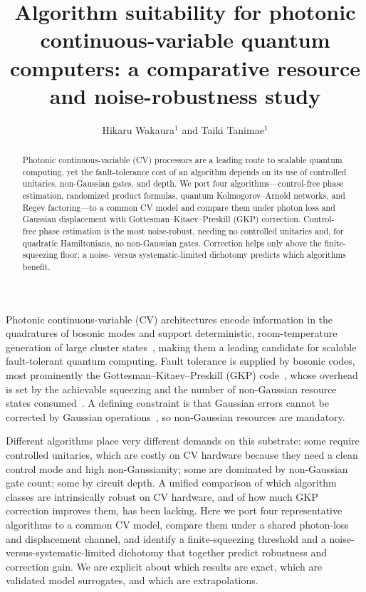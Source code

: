\documentclass[10pt]{iopart}
\begin{document}
\title[Algorithm suitability for photonic continuous-variable hardware]{Algorithm suitability for photonic continuous-variable
quantum computers: a comparative resource and noise-robustness study}

\author{Hikaru Wakaura$^{1}$ and Taiki Tanimae$^{1}$}
\address{$^{1}$ QIRI (Quantum Integrated Research Institute Inc.),
1--16--3 Akasaka, Minato-ku, Tokyo 107--0061, Japan}

\begin{abstract} 
Photonic continuous-variable (CV) processors are a leading route to scalable
quantum computing, yet the fault-tolerance cost of an algorithm depends on its
use of controlled unitaries, non-Gaussian gates, and depth. We port four
algorithms---control-free phase estimation, randomized product formulas,
quantum Kolmogorov--Arnold networks, and Regev factoring---to a common CV model
and compare them under photon loss and Gaussian displacement with
Gottesman--Kitaev--Preskill (GKP) correction. Control-free phase estimation is
the most noise-robust, needing no controlled unitaries and, for quadratic
Hamiltonians, no non-Gaussian gates. Correction helps only above the
finite-squeezing floor; a noise- versus systematic-limited dichotomy predicts
which algorithms benefit.  
\end{abstract}
   
\maketitle
\ioptwocol 
  
Photonic continuous-variable (CV) architectures encode information in the
quadratures of bosonic modes and support deterministic, room-temperature
generation of large cluster states~\cite{Lloyd1999,Menicucci2014,Larsen2019,
Asavanant2019,Madsen2022}, making them a leading candidate for scalable
fault-tolerant quantum computing. Fault tolerance is supplied by bosonic codes,
most prominently the Gottesman--Kitaev--Preskill (GKP) code~\cite{GKP2001},
whose overhead is set by the achievable squeezing and the number of
non-Gaussian resource states consumed~\cite{Fukui2018,Bourassa2021,Tzitrin2021,
Noh2020}. A defining constraint is that Gaussian errors cannot be corrected by
Gaussian operations~\cite{Niset2009}, so non-Gaussian resources are mandatory.

Different algorithms place very different demands on this substrate: some
require controlled unitaries, which are costly on CV hardware because they need
a clean control mode and high non-Gaussianity; some are dominated by
non-Gaussian gate count; some by circuit depth. A unified comparison of which
algorithm classes are intrinsically robust on CV hardware, and of how much GKP
correction improves them, has been lacking. Here we port four representative
algorithms to a common CV model, compare them under a shared photon-loss and
displacement channel, and identify a finite-squeezing threshold and a
noise-versus-systematic-limited dichotomy that together predict robustness and
correction gain. We are explicit about which results are exact, which are
validated model surrogates, and which are extrapolations.
\end{document}
